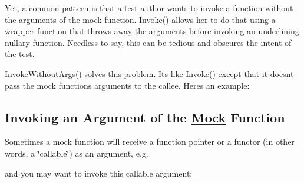 Yet, a common pattern is that a test author wants to invoke a function without the arguments of the mock function. {\ttfamily \mbox{\hyperlink{namespacetesting_a12aebaf8363d49a383047529f798b694}{Invoke()}}} allows her to do that using a wrapper function that throws away the arguments before invoking an underlining nullary function. Needless to say, this can be tedious and obscures the intent of the test.

{\ttfamily \mbox{\hyperlink{namespacetesting_a88cc1999296bc630f6a49cdf66bb21f9}{Invoke\+Without\+Args()}}} solves this problem. It\textquotesingle{}s like {\ttfamily \mbox{\hyperlink{namespacetesting_a12aebaf8363d49a383047529f798b694}{Invoke()}}} except that it doesn\textquotesingle{}t pass the mock function\textquotesingle{}s arguments to the callee. Here\textquotesingle{}s an example\+:


\begin{DoxyCode}{0}
\DoxyCodeLine{}
\DoxyCodeLine{\};}
\DoxyCodeLine{}
\DoxyCodeLine{}
\DoxyCodeLine{}
\end{DoxyCode}


\subsection*{Invoking an Argument of the \mbox{\hyperlink{classMock}{Mock}} Function}

Sometimes a mock function will receive a function pointer or a functor (in other words, a \char`\"{}callable\char`\"{}) as an argument, e.\+g.


\begin{DoxyCode}{0}
\DoxyCodeLine{\};}
\end{DoxyCode}


and you may want to invoke this callable argument\+:


\begin{DoxyCode}{0}
\end{DoxyCode}


